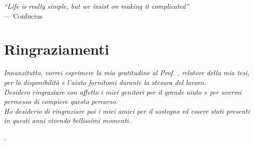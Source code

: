 \cleardoublepage
{}
{}


\begin{flushright}{
    \slshape
    ``Life is really simple, but we insist on making it complicated''} \\
    \medskip
    --- Confucius
\end{flushright}


\bigskip

\begingroup
\let\clearpage\relax
\let\cleardoublepage\relax
\let\cleardoublepage\relax

\chapter*{Ringraziamenti}

\noindent \textit{Innanzitutto, vorrei esprimere la mia gratitudine al Prof. \myProf, relatore della mia tesi, per la disponibilità e l'aiuto fornitomi durante la stesura del lavoro.}\\

\noindent \textit{Desidero ringraziare con affetto i miei genitori per il grande aiuto e per avermi permesso di compiere questo percorso.}\\

\noindent \textit{Ho desiderio di ringraziare poi i miei amici per il sostegno ed essere stati presenti in questi anni vivendo bellissimi momenti.}\\
\bigskip

\noindent\textit{\myLocation, \myTime}
\hfill \myName

\endgroup
